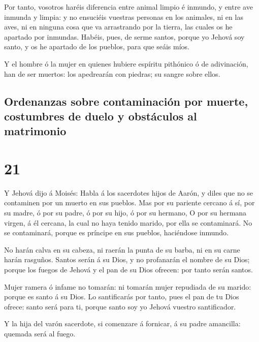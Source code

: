  Por tanto, vosotros haréis diferencia entre animal
limpio é inmundo, y entre ave inmunda y limpia: y no ensuciéis vuestras
personas en los animales, ni en las aves, ni en ninguna cosa que va
arrastrando por la tierra, las cuales os he apartado por inmundas.
 Habéis, pues, de serme santos, porque yo Jehová soy
santo, y os he apartado de los pueblos, para que seáis míos.

 Y el hombre ó la mujer en quienes hubiere espíritu
pithónico ó de adivinación, han de ser muertos: los apedrearán con
piedras; su sangre sobre ellos.

\hypertarget{ordenanzas-sobre-contaminaciuxf3n-por-muerte-costumbres-de-duelo-y-obstuxe1culos-al-matrimonio}{%
\subsection{Ordenanzas sobre contaminación por muerte, costumbres de
duelo y obstáculos al
matrimonio}\label{ordenanzas-sobre-contaminaciuxf3n-por-muerte-costumbres-de-duelo-y-obstuxe1culos-al-matrimonio}}

\hypertarget{section-03-21}{%
\section{21}\label{section-03-21}}

 Y Jehová dijo á Moisés: Habla á los sacerdotes hijos de
Aarón, y diles que no se contaminen por un muerto en sus pueblos.
 Mas por su pariente cercano á sí, por su madre, ó por su
padre, ó por su hijo, ó por su hermano,  O por su hermana
virgen, á él cercana, la cual no haya tenido marido, por ella se
contaminará.  No se contaminará, porque es príncipe en sus
pueblos, haciéndose inmundo.

 No harán calva en su cabeza, ni raerán la punta de su
barba, ni en su carne harán rasguños.  Santos serán á su
Dios, y no profanarán el nombre de su Dios; porque los fuegos de Jehová
y el pan de su Dios ofrecen: por tanto serán santos.

 Mujer ramera ó infame no tomarán: ni tomarán mujer
repudiada de su marido: porque es santo á su Dios.  Lo
santificarás por tanto, pues el pan de tu Dios ofrece: santo será para
ti, porque santo soy yo Jehová vuestro santificador.

 Y la hija del varón sacerdote, si comenzare á fornicar, á
su padre amancilla: quemada será al fuego.

